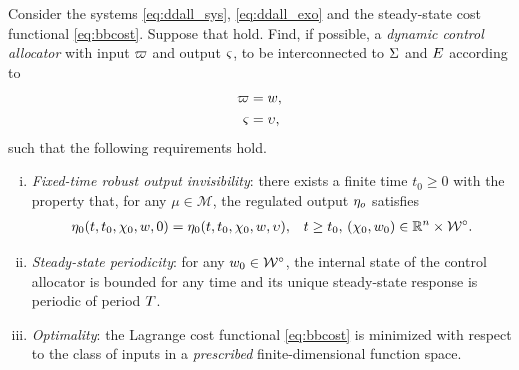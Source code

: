 \begin{problem}
  \label{prb:ddall_main_per}
  Consider the systems \eqref{eq:ddall_sys}, \eqref{eq:ddall_exo} and the steady-state cost functional \eqref{eq:bbcost}. Suppose that  hold. Find, if possible, a \emph{dynamic control allocator} with input $\varpi$ and output $\varsigma$, to be interconnected to $\Sigma$ and $E$ according to
  \begin{subequations}
    \label{eq:ddall_all_interc}
    \begin{align}
      \varpi &= w,\\
      \varsigma &= \upsilon,
    \end{align}
  \end{subequations}
  such that the following requirements hold.
  \begin{enumerate}[(i)]
    \item \emph{Fixed-time robust output invisibility}: there exists a finite time $t_0 \geq 0$ with the property that, for any $\mu\in\mathcal{M}$, the regulated output $\eta_o$ satisfies
    \begin{align}
      \label{eq:ddall_output_invis}
      \eta_0(t,t_0,\chi_0,w,0) &= \eta_0(t,t_0,\chi_0,w,\upsilon), & t \geq t_0,\,(\chi_0,w_0)\in\mathbb{R}^{n}\times\mathcal{W}^\circ.
    \end{align}
    \item \emph{Steady-state periodicity}: for any $w_0\in\mathcal{W}^\circ$, the internal state of the control allocator is bounded for any time and its unique steady-state response is periodic of period $T$.
    \item \emph{Optimality}: the Lagrange cost functional \eqref{eq:bbcost} is minimized with respect to the class of inputs in a \emph{prescribed} finite-dimensional function space.
  \end{enumerate}
  \closestatement
\end{problem}

